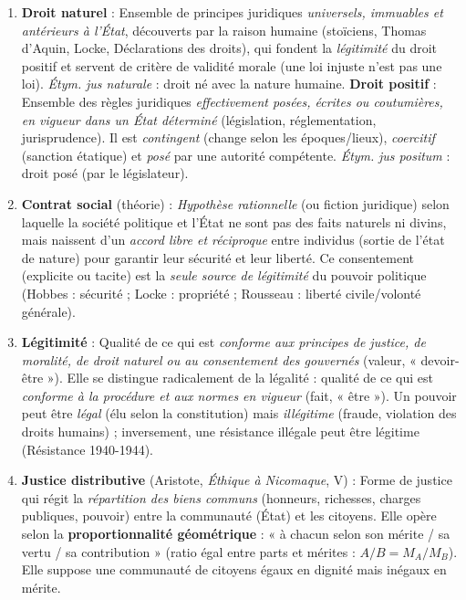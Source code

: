 \documentclass[11pt]{article}
\newcommand{\cle}[1]{{\popxbold\color{popdark}#1}}
\begin{document}
\begin{corrige}
\begin{enumerate}
    \item \textbf{Droit naturel} : Ensemble de principes juridiques \emph{universels, immuables et antérieurs à l'État}, découverts par la raison humaine (stoïciens, Thomas d'Aquin, Locke, Déclarations des droits), qui fondent la \emph{légitimité} du droit positif et servent de critère de validité morale (une loi injuste n'est pas une loi). \emph{Étym.} \emph{jus naturale} : droit né avec la nature humaine.
    \textbf{Droit positif} : Ensemble des règles juridiques \emph{effectivement posées, écrites ou coutumières, en vigueur dans un État déterminé} (législation, réglementation, jurisprudence). Il est \emph{contingent} (change selon les époques/lieux), \emph{coercitif} (sanction étatique) et \emph{posé} par une autorité compétente. \emph{Étym.} \emph{jus positum} : droit posé (par le législateur).
    \item \textbf{Contrat social} (théorie) : \emph{Hypothèse rationnelle} (ou fiction juridique) selon laquelle la société politique et l'État ne sont pas des faits naturels ni divins, mais naissent d'un \emph{accord libre et réciproque} entre individus (sortie de l'état de nature) pour garantir leur sécurité et leur liberté. Ce consentement (explicite ou tacite) est la \emph{seule source de légitimité} du pouvoir politique (Hobbes : sécurité ; Locke : propriété ; Rousseau : liberté civile/volonté générale).
    \item \textbf{Légitimité} : Qualité de ce qui est \emph{conforme aux principes de justice, de moralité, de droit naturel ou au consentement des gouvernés} (valeur, « devoir-être »). Elle se distingue radicalement de la \cle{légalité} : qualité de ce qui est \emph{conforme à la procédure et aux normes en vigueur} (fait, « être »). Un pouvoir peut être \emph{légal} (élu selon la constitution) mais \emph{illégitime} (fraude, violation des droits humains) ; inversement, une résistance illégale peut être légitime (Résistance 1940-1944).
    \item \textbf{Justice distributive} (Aristote, \emph{Éthique à Nicomaque}, V) : Forme de justice qui régit la \emph{répartition des biens communs} (honneurs, richesses, charges publiques, pouvoir) entre la communauté (État) et les citoyens. Elle opère selon la \textbf{proportionnalité géométrique} : « à chacun selon son mérite / sa vertu / sa contribution » (ratio égal entre parts et mérites : $A/B = M_A/M_B$). Elle suppose une communauté de citoyens égaux en dignité mais inégaux en mérite.
\end{enumerate}
\end{corrige}
\end{document}
